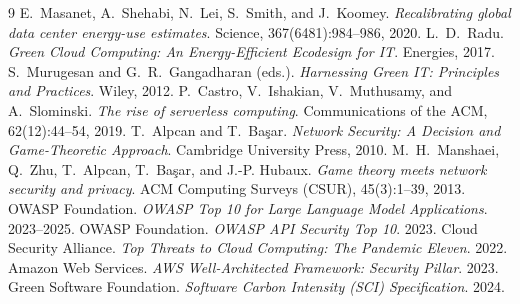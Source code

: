 \documentclass[10pt,twocolumn]{article}
\begin{document}
\begin{thebibliography}{9}
\small
{} E.~Masanet, A.~Shehabi, N.~Lei, S.~Smith, and J.~Koomey.
\emph{Recalibrating global data center energy-use estimates}. Science,
367(6481):984--986, 2020.
 L.~D.~Radu. \emph{Green Cloud Computing: An Energy-Efficient
Ecodesign for IT}. Energies, 2017.
 S.~Murugesan and G.~R.~Gangadharan (eds.). \emph{Harnessing Green
IT: Principles and Practices}. Wiley, 2012.
 P.~Castro, V.~Ishakian, V.~Muthusamy, and A.~Slominski. \emph{The
rise of serverless computing}. Communications of the ACM, 62(12):44--54, 2019.
 T.~Alpcan and T.~Ba\c{s}ar. \emph{Network Security: A Decision and
Game-Theoretic Approach}. Cambridge University Press, 2010.
 M.~H.~Manshaei, Q.~Zhu, T.~Alpcan, T.~Ba\c{s}ar, and J.-P.
Hubaux. \emph{Game theory meets network security and privacy}. ACM Computing Surveys
(CSUR), 45(3):1--39, 2013.
 OWASP Foundation. \emph{OWASP Top 10 for Large Language Model
Applications}. 2023--2025.
 OWASP Foundation. \emph{OWASP API Security Top 10}. 2023.
 Cloud Security Alliance. \emph{Top Threats to Cloud Computing: The
Pandemic Eleven}. 2022.
 Amazon Web Services. \emph{AWS Well-Architected Framework: Security
Pillar}. 2023.
 Green Software Foundation. \emph{Software Carbon Intensity (SCI)
Specification}. 2024.
\end{thebibliography}
\end{document}
